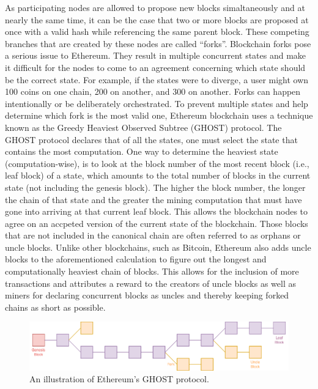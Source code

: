     As participating nodes are allowed to propose new blocks simaltaneously and at nearly the same time, it can be the case that two or more blocks are proposed at once with a valid hash while referencing the same parent block.
    These competing branches that are created by these nodes are called “forks”.
    Blockchain forks pose a serious issue to Ethereum.
    They result in multiple concurrent states and make it difficult for the nodes to come to an agreement concerning which state should be the correct state.
    For example, if the states were to diverge, a user might own 100 coins on one chain, 200 on another, and 300 on another.
    Forks can happen intentionally or be deliberately orchestrated.
    To prevent multiple states and help determine which fork is the most valid one, Ethereum blockchain uses a technique known as the Greedy Heaviest Observed Subtree (GHOST) protocol.
    The GHOST protocol declares that of all the states, one must select the state that contains the most computation.
    One way to determine the heaviest state (computation-wise), is to look at the block number of the most recent block (i.e., leaf block) of a state, which amounts to the total number of blocks in the current state (not including the genesis block).
    The higher the block number, the longer the chain of that state and the greater the mining computation that must have gone into arriving at that current leaf block.
    This allows the blockchain nodes to agree on an accpeted version of the current state of the blockchain.
    Those blocks that are not included in the canonical chain are often referred to as orphans or uncle blocks.
    Unlike other blockchains, such as Bitcoin, Ethereum also adds uncle blocks to the aforementioned calculation to figure out the longest and computationally heaviest chain of blocks.
    This allows for the inclusion of more transactions and attributes a reward to the creators of uncle blocks as well as miners for declaring concurrent blocks as uncles and thereby keeping forked chains as short as possible.

    \begin{figure}
        \centering
        \includegraphics[width=\textwidth]{figures/uncle.png}
        \caption{An illustration of Ethereum's GHOST protocol.}
        \label{fig:uncle}
    \end{figure}

